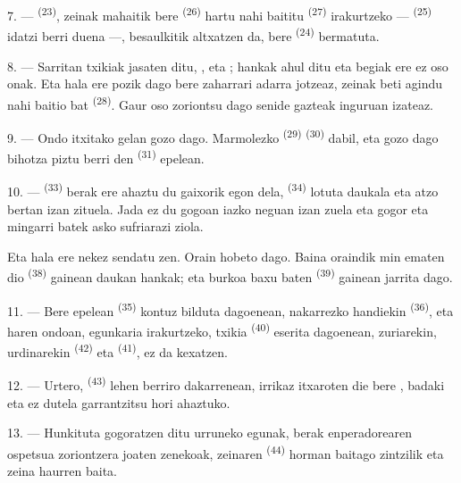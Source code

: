 7. ---  \textsuperscript{(23)}, zeinak mahaitik bere
 \textsuperscript{(26)} hartu nahi baititu
 \textsuperscript{(27)} irakurtzeko --- 
\textsuperscript{(25)} idatzi berri duena ---, besaulkitik altxatzen da, bere
 \textsuperscript{(24)} bermatuta.

8. --- Sarritan  txikiak jasaten ditu, ,
 eta ; hankak ahul ditu eta begiak ere
ez oso onak. Eta hala ere pozik dago bere  zaharrari adarra
jotzeaz, zeinak beti agindu nahi baitio  bat
\textsuperscript{(28)}. Gaur oso zoriontsu dago senide gazteak inguruan izateaz.

9. --- Ondo itxitako gelan gozo dago. Marmolezko 
\textsuperscript{(29)}  \textsuperscript{(30)} dabil, eta gozo
dago bihotza piztu berri den  \textsuperscript{(31)}
 epelean.

\VUsaut{4.2mm}
\VUsaut{3.0mm}

10. ---  \textsuperscript{(33)} berak ere ahaztu du gaixorik egon
dela,   \textsuperscript{(34)} lotuta
daukala eta atzo bertan  izan zituela.
Jada ez du gogoan iazko neguan  izan zuela eta 
gogor eta mingarri batek asko sufriarazi ziola.

Eta hala ere nekez sendatu zen. Orain hobeto dago. Baina oraindik min ematen dio
 \textsuperscript{(38)} gainean daukan hankak; eta burkoa
 baxu baten \textsuperscript{(39)} gainean jarrita dago.

11. --- Bere  epelean \textsuperscript{(35)} kontuz bilduta
dagoenean, nakarrezko  handiekin \textsuperscript{(36)}, eta haren
ondoan, egunkaria irakurtzeko,  txikia \textsuperscript{(40)}
eserita dagoenean,  zuriarekin,  urdinarekin
\textsuperscript{(42)} eta  \textsuperscript{(41)}, ez da
kexatzen.

12. --- Urtero,  \textsuperscript{(43)} 
lehen  berriro dakarrenean, irrikaz itxaroten die bere
, badaki eta ez dutela  garrantzitsu hori ahaztuko.

13. --- Hunkituta gogoratzen ditu urruneko egunak, berak enperadorearen
 ospetsua zoriontzera joaten zenekoak, zeinaren
 \textsuperscript{(44)} horman baitago zintzilik eta zeina
haurren  baita.
\VUsaut{6.0mm}
\VUfilet{22mm}
